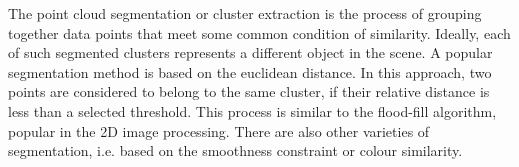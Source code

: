 The point cloud segmentation or cluster extraction is the process of grouping together data points that meet some common condition of similarity. Ideally, each of such segmented clusters represents a different object in the scene. A popular segmentation method is based on the euclidean distance. In this approach, two points are considered to belong to the same cluster, if their relative distance is less than a selected threshold. This process is similar to the flood-fill algorithm, popular in the 2D image processing. There are also other varieties of segmentation, i.e. based on the smoothness constraint or colour similarity.

